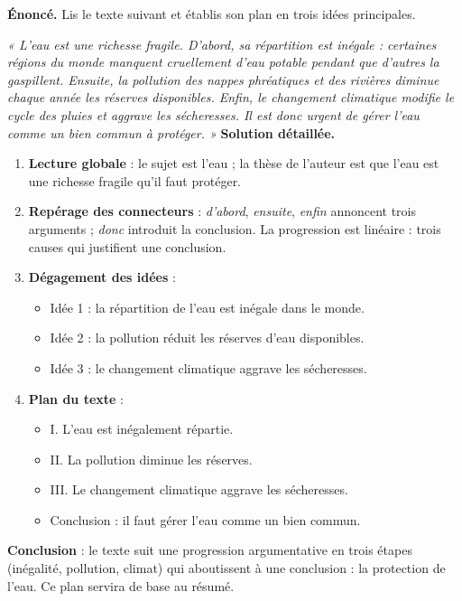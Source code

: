 \documentclass[11pt]{article}
\begin{document}
\begin{exoresolu}
\textbf{Énoncé.} Lis le texte suivant et établis son plan en trois idées principales.

\emph{« L'eau est une richesse fragile. D'abord, sa répartition est inégale : certaines régions du monde manquent cruellement d'eau potable pendant que d'autres la gaspillent. Ensuite, la pollution des nappes phréatiques et des rivières diminue chaque année les réserves disponibles. Enfin, le changement climatique modifie le cycle des pluies et aggrave les sécheresses. Il est donc urgent de gérer l'eau comme un bien commun à protéger. »}
\tcblower
\textbf{Solution détaillée.}
\begin{enumerate}
\item \textbf{Lecture globale} : le sujet est l'eau ; la thèse de l'auteur est que l'eau est une richesse fragile qu'il faut protéger.
\item \textbf{Repérage des connecteurs} : \emph{d'abord}, \emph{ensuite}, \emph{enfin} annoncent trois arguments ; \emph{donc} introduit la conclusion. La progression est linéaire : trois causes qui justifient une conclusion.
\item \textbf{Dégagement des idées} :
\begin{itemize}
\item Idée 1 : la répartition de l'eau est inégale dans le monde.
\item Idée 2 : la pollution réduit les réserves d'eau disponibles.
\item Idée 3 : le changement climatique aggrave les sécheresses.
\end{itemize}
\item \textbf{Plan du texte} :
\begin{itemize}
\item I. L'eau est inégalement répartie.
\item II. La pollution diminue les réserves.
\item III. Le changement climatique aggrave les sécheresses.
\item Conclusion : il faut gérer l'eau comme un bien commun.
\end{itemize}
\end{enumerate}
\textbf{Conclusion} : le texte suit une progression argumentative en trois étapes (inégalité, pollution, climat) qui aboutissent à une conclusion : la protection de l'eau. Ce plan servira de base au résumé.
\end{exoresolu}
\end{document}
